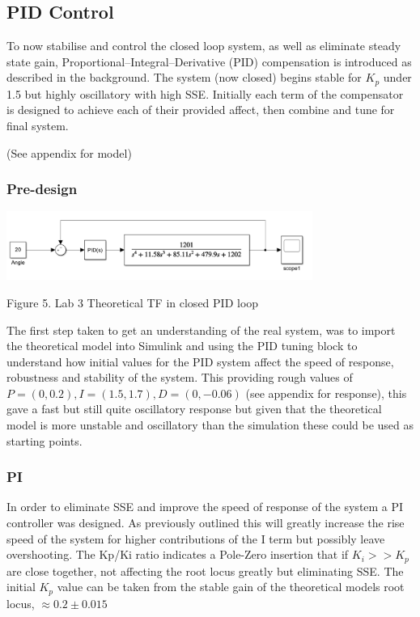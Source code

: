 \documentclass[a4paper,11pt]{article}
\begin{document}
\newpage
\subsection{PID Control}
To now stabilise and control the closed loop system, as well as eliminate steady state gain, Proportional–Integral–Derivative (PID) compensation is introduced as described in the background.
The system (now closed) begins stable for $K_p$ under 1.5 but highly oscillatory with high SSE. Initially each term of the compensator is designed to achieve each of their provided affect, then combine and tune for final system.

(See appendix for model)

\subsubsection{Pre-design}

{\centering\includegraphics[width=0.75\textwidth]{inc/lab3_pid.png}\\}
\begin{center}
        Figure 5. Lab 3 Theoretical TF in closed PID loop
\end{center}
The first step taken to get an understanding of the real system, was to import the theoretical model into Simulink and using the PID tuning block to understand how initial values for the PID system affect the speed of response, robustness and stability of the system. This providing rough values of $P=(0,0.2), I=(1.5,1.7), D=(0,-0.06)$ (see appendix for response), this gave a fast but still quite oscillatory response but given that the theoretical model is more unstable and oscillatory than the simulation these could be used as starting points.

\subsubsection{PI}
In order to eliminate SSE and improve the speed of response of the system a PI controller was designed. As previously outlined this will greatly increase the rise speed of the system for higher contributions of the I term but possibly leave overshooting. The Kp/Ki ratio indicates a Pole-Zero insertion that if $K_i >> K_p$ are close together, not affecting the root locus greatly but eliminating SSE. The initial $K_p$ value can be taken from the stable gain of the theoretical models root locus, $\approx0.2\pm 0.015$
\end{document}
